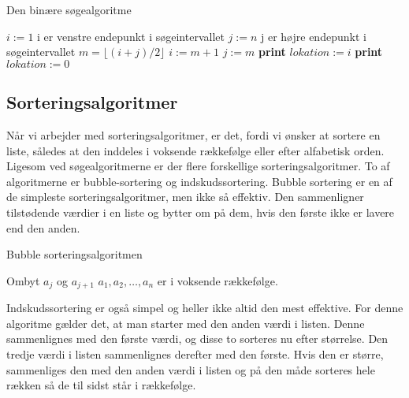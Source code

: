 \begin{algorithm}
\caption{Den binære søgealgoritme}
\begin{algorithmic}[1]

    \State $i:=1$ {i er venstre endepunkt i søgeintervallet}
    \State $j:=n$ {j er højre endepunkt i søgeintervallet}
        \State $m=\lfloor (i+j)/2 \rfloor$
    		\State $i:=m+1$
    		\Else
    		\State $j:=m$
    		\EndIf
    \State \textbf{print} $lokation:=i$
    \Else
    \State \textbf{print} $lokation:=0$
    \EndIf
    \EndWhile  \label{roy's loop}
\EndProcedure

\end{algorithmic}
\end{algorithm}

\subsection{Sorteringsalgoritmer}
Når vi arbejder med sorteringsalgoritmer, er det, fordi vi ønsker at sortere en liste, således at den inddeles i voksende rækkefølge eller efter alfabetisk orden. Ligesom ved søgealgoritmerne er der flere forskellige sorteringsalgoritmer. To af algoritmerne er bubble-sortering og indskudssortering. Bubble sortering er en af de simpleste sorteringsalgoritmer, men ikke så effektiv. Den sammenligner tilstødende værdier i en liste og bytter om på dem, hvis den første ikke er lavere end den anden.

\begin{algorithm}
\caption{Bubble sorteringsalgoritmen}
\begin{algorithmic}[1]

\EndProcedure
{}
    			\State Ombyt $a_{j}$ og $a_{j+1}$ 	
\EndIf
\EndFor
\EndFor
\State $a_{1},a_{2},\dotsc,a_{n}$ er i voksende rækkefølge. 

\end{algorithmic}
\end{algorithm}

Indskudssortering er også simpel og heller ikke altid den mest effektive. For denne algoritme gælder det, at man starter med den anden værdi i listen. Denne sammenlignes med den første værdi, og disse to sorteres nu efter størrelse. Den tredje værdi i listen sammenlignes derefter med den første. Hvis den er større, sammenliges den med den anden værdi i listen og på den måde sorteres hele rækken så de til sidst står i rækkefølge.

